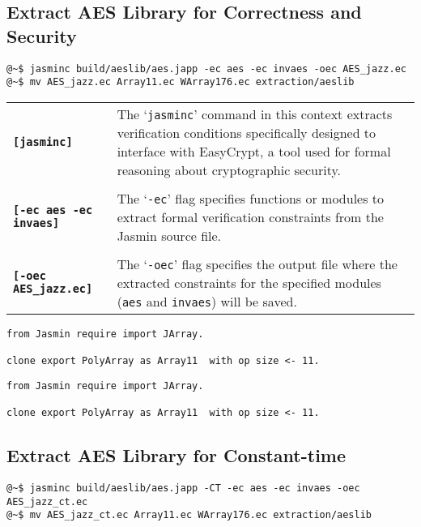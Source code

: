 \subsection{Extract AES Library for Correctness and Security}
\begin{center}

\end{center}
\begin{lstlisting}[style=normal]
@~$ jasminc build/aeslib/aes.japp -ec aes -ec invaes -oec AES_jazz.ec
@~$ mv AES_jazz.ec Array11.ec WArray176.ec extraction/aeslib
\end{lstlisting}
\begin{table}[h!]
\begin{tabularx}{\textwidth}{>{\raggedleft\arraybackslash}p{}p{}}
	\textbf{\texttt{[jasminc]}}  & The `\texttt{jasminc}' command in this context extracts verification conditions specifically designed to interface with EasyCrypt, a tool used for formal reasoning about cryptographic security. \\ \\
	\textbf{\texttt{[-ec aes -ec invaes]}} & The `\texttt{-ec}' flag specifies functions or modules to extract formal verification constraints from the Jasmin source file.
	\\ \\
	\textbf{\texttt{[-oec AES\_jazz.ec]}} & The `\texttt{-oec}' flag specifies the output file where the extracted constraints for the specified modules (\texttt{aes} and \texttt{invaes}) will be saved.
\end{tabularx}
\end{table}
\begin{lstlisting}[style=easycrypt, caption={Array11.ec}, captionpos=t]
from Jasmin require import JArray.

clone export PolyArray as Array11  with op size <- 11.
\end{lstlisting}
\begin{lstlisting}[style=easycrypt, caption={WArray176.ec}, captionpos=t]
from Jasmin require import JArray.

clone export PolyArray as Array11  with op size <- 11.
\end{lstlisting}


\subsection{Extract AES Library for Constant-time}
\begin{center}
%
\end{center}
\begin{lstlisting}[style=normal]
@~$ jasminc build/aeslib/aes.japp -CT -ec aes -ec invaes -oec AES_jazz_ct.ec
@~$ mv AES_jazz_ct.ec Array11.ec WArray176.ec extraction/aeslib
\end{lstlisting}
